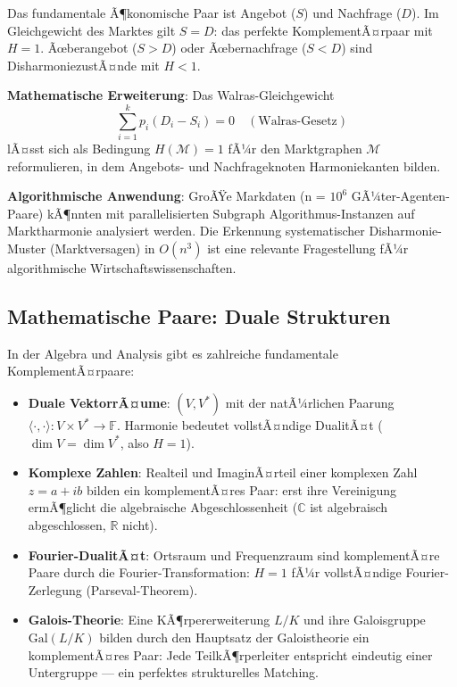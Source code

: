 ﻿\documentclass[a4paper,12pt]{article}
\theoremstyle{definition}
\begin{document}
Das fundamentale Ã¶konomische Paar ist Angebot ($S$) und Nachfrage ($D$).
Im Gleichgewicht des Marktes gilt $S = D$: das perfekte KomplementÃ¤rpaar mit $H = 1$.
Ãœberangebot ($S > D$) oder Ãœbernachfrage ($S < D$) sind DisharmoniezustÃ¤nde mit $H < 1$.

\textbf{Mathematische Erweiterung}: Das Walras-Gleichgewicht \cite{lotka1925}
\[
	\sum_{i=1}^k p_i (D_i - S_i) = 0 \quad (\text{Walras-Gesetz})
\]
lÃ¤sst sich als Bedingung $H(\mathcal{M}) = 1$ fÃ¼r den Marktgraphen $\mathcal{M}$
reformulieren, in dem Angebots- und Nachfrageknoten Harmoniekanten bilden.

\textbf{Algorithmische Anwendung}: GroÃŸe Markdaten (n = $10^6$ GÃ¼ter-Agenten-Paare)
kÃ¶nnten mit parallelisierten Subgraph Algorithmus-Instanzen auf Marktharmonie
analysiert werden. Die Erkennung systematischer Disharmonie-Muster (Marktversagen)
in $O(n^3)$ ist eine relevante Fragestellung fÃ¼r algorithmische Wirtschaftswissenschaften.

\subsection{Mathematische Paare: Duale Strukturen}

In der Algebra und Analysis gibt es zahlreiche fundamentale KomplementÃ¤rpaare:
\begin{itemize}
	\item \textbf{Duale VektorrÃ¤ume}: $(V, V^*)$ mit der natÃ¼rlichen Paarung
	$\langle \cdot, \cdot \rangle: V \times V^* \to \mathbb{F}$. Harmonie bedeutet
	vollstÃ¤ndige DualitÃ¤t ($\dim V = \dim V^*$, also $H = 1$).
	
	\item \textbf{Komplexe Zahlen}: Realteil und ImaginÃ¤rteil einer komplexen Zahl
	$z = a + ib$ bilden ein komplementÃ¤res Paar: erst ihre Vereinigung ermÃ¶glicht
	die algebraische Abgeschlossenheit ($\mathbb{C}$ ist algebraisch abgeschlossen,
	$\mathbb{R}$ nicht).
	
	\item \textbf{Fourier-DualitÃ¤t}: Ortsraum und Frequenzraum sind komplementÃ¤re
	Paare durch die Fourier-Transformation: $H = 1$ fÃ¼r vollstÃ¤ndige Fourier-Zerlegung
	(Parseval-Theorem).
	
	\item \textbf{Galois-Theorie}: Eine KÃ¶rpererweiterung $L/K$ und ihre Galoisgruppe
	$\text{Gal}(L/K)$ bilden durch den Hauptsatz der Galoistheorie ein komplementÃ¤res
	Paar: Jede TeilkÃ¶rperleiter entspricht eindeutig einer Untergruppe --- ein perfektes
	strukturelles Matching.
\end{itemize}
\end{document}
